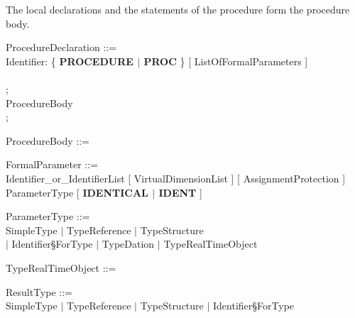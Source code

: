 The local declarations and the statements of the procedure form the
procedure body.

\begin{front}
ProcedureDeclaration ::= \\
\x Identifier: \{ {\bf PROCEDURE $\mid$ PROC} \} [ ListOfFormalParameters ]\\
\x [ ResultAttribute ]\\
\x [ GlobalAttribute ] ;\\
\x ProcedureBody\\
;

ProcedureBody ::= \\
\x [ Declaration$^{...}$ ] [ Statement$^{...}$ ]

\end{front}
\begin{grammar}


\end{grammar}



\begin{front}
FormalParameter ::=\\
\x Identifier\_or\_IdentifierList [ VirtualDimensionList ] [ AssignmentProtection ]\\
\x ParameterType [ {\bf IDENTICAL $\mid$ IDENT} ]
\end{front}
\begin{grammar}

\end{grammar}



\begin{front}

ParameterType ::= \\
\x SimpleType $\mid$ TypeReference $\mid$ TypeStructure\\
\x $\mid$ Identifier\S ForType $\mid$ TypeDation $\mid$ TypeRealTimeObject
\end{front}
\begin{grammar}

\end{grammar}



\begin{front}
TypeRealTimeObject ::=\\

ResultType ::= \\
\x SimpleType $\mid$ TypeReference $\mid$ TypeStructure $\mid$ Identifier\S ForType
\end{front}
\begin{grammar}


\end{grammar}

